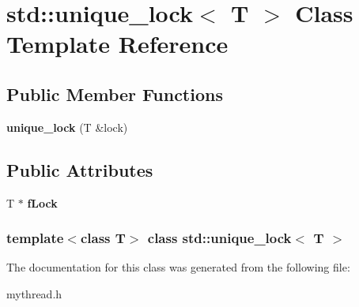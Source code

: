 \hypertarget{classstd_1_1unique__lock}{\section{std\-:\-:unique\-\_\-lock$<$ \-T $>$ \-Class \-Template \-Reference}
\label{classstd_1_1unique__lock}
}
\subsection*{\-Public \-Member \-Functions}
\begin{DoxyCompactItemize}
\item 
\hypertarget{classstd_1_1unique__lock_af49fc0cbc48df88db2a2483739c6c8f2}{{\bfseries unique\-\_\-lock} (\-T \&lock)}\label{classstd_1_1unique__lock_af49fc0cbc48df88db2a2483739c6c8f2}

\end{DoxyCompactItemize}
\subsection*{\-Public \-Attributes}
\begin{DoxyCompactItemize}
\item 
\hypertarget{classstd_1_1unique__lock_aef428f6730b325c03236079cc367a264}{\-T $\ast$ {\bfseries f\-Lock}}\label{classstd_1_1unique__lock_aef428f6730b325c03236079cc367a264}

\end{DoxyCompactItemize}
\subsubsection*{template$<$class \-T$>$ class std\-::unique\-\_\-lock$<$ T $>$}



\-The documentation for this class was generated from the following file\-:\begin{DoxyCompactItemize}
\item 
mythread.\-h\end{DoxyCompactItemize}
